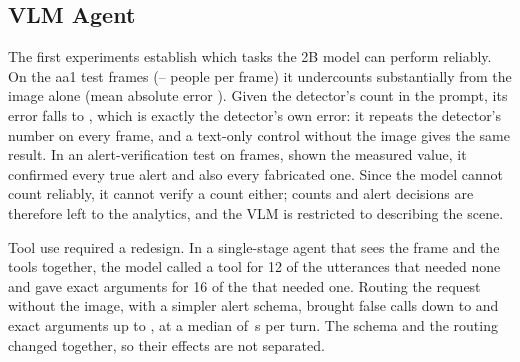 \subsection{VLM Agent}
\label{sec:vlm}
The first experiments establish which tasks the 2B model can perform reliably. On the \EoFrames{} aa1 test frames (\EoGtMin--\EoGtMax{} people
per frame) it undercounts substantially from the image alone (mean absolute error \EoMaeB). Given the detector's count in the
prompt, its error falls to \EoMaeC{}, which is exactly the detector's own error: it repeats the detector's number on
every frame, and a text-only control without the image gives the same result. In an alert-verification test on
\EvN{} frames, shown the measured value, it confirmed every true alert and also every fabricated one. Since the model
cannot count reliably, it cannot verify a count either; counts and alert decisions are therefore left to the
analytics, and the VLM is restricted to describing the scene.

Tool use required a redesign. In a single-stage agent that sees the frame and the tools together, the model called a
tool for 12 of the \EthNNoTool{} utterances that needed none and gave exact arguments for 16 of the \EthNTool{}
that needed one. Routing the request without the image, with a simpler alert schema, brought false calls
down to \EtbFp{} and exact arguments up to \EtbArg, at a median of \EtbLat\,s per turn. The schema and the routing
changed together, so their effects are not separated.

